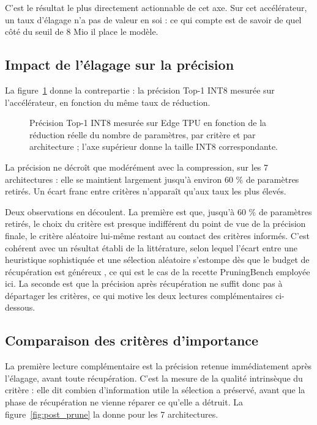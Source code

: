 \documentclass[11pt,a4paper]{report}
\begin{document}
C'est le résultat le plus directement actionnable de cet axe. Sur cet accélérateur, un taux d'élagage n'a pas de valeur en soi : ce qui compte est de savoir de quel côté du seuil de 8 Mio il place le modèle.

\subsection{Impact de l'élagage sur la précision}

La figure~\ref{fig:accuracy_panel} donne la contrepartie : la précision Top-1 INT8 mesurée sur l'accélérateur, en fonction du même taux de réduction.

\begin{figure}[H]
    \centering
    
    \caption{Précision Top-1 INT8 mesurée sur Edge TPU en fonction de la réduction réelle du nombre de paramètres, par critère et par architecture ; l'axe supérieur donne la taille INT8 correspondante.}
    \label{fig:accuracy_panel}
\end{figure}

La précision ne décroît que modérément avec la compression, sur les 7 architectures : elle se maintient largement jusqu'à environ 60 \% de paramètres retirés. Un écart franc entre critères n'apparaît qu'aux taux les plus élevés.

Deux observations en découlent. La première est que, jusqu'à 60 \% de paramètres retirés, le choix du critère est presque indifférent du point de vue de la précision finale, le critère aléatoire lui-même restant au contact des critères informés. C'est cohérent avec un résultat établi de la littérature, selon lequel l'écart entre une heuristique sophistiquée et une sélection aléatoire s'estompe dès que le budget de récupération est généreux \cite{liuRethinkingValueNetwork2019}, ce qui est le cas de la recette PruningBench employée ici. La seconde est que la précision après récupération ne suffit donc pas à départager les critères, ce qui motive les deux lectures complémentaires ci-dessous.

\subsection{Comparaison des critères d'importance}

La première lecture complémentaire est la précision retenue immédiatement après l'élagage, avant toute récupération. C'est la mesure de la qualité intrinsèque du critère : elle dit combien d'information utile la sélection a préservé, avant que la phase de récupération ne vienne réparer ce qu'elle a détruit. La figure~\ref{fig:post_prune} la donne pour les 7 architectures.
\end{document}
